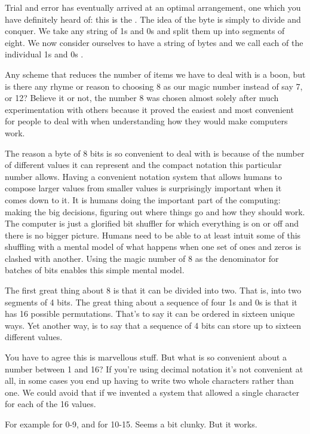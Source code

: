 Trial and error has eventually arrived at an optimal arrangement, one which
you have definitely heard of: this is the . The idea of the byte
is simply to divide and conquer. We take any string of 1s and 0s and split
them up into segments of eight. We now consider ourselves to have a string
of bytes and we call each of the individual 1s and 0s . 

Any scheme that reduces the number of items we have to deal with is a boon,
but is there any rhyme or reason to choosing 8 as our magic number instead
of say 7, or 12? Believe it or not, the number 8 was chosen almost solely
after much experimentation with others because it proved the easiest and
most convenient for people to deal with when understanding how they would
make computers work.

The reason a byte of 8 bits is so convenient to deal with is because of
the number of different values it can represent and the compact notation
this particular number allows. Having a convenient notation system that
allows humans to compose larger values from smaller values is surprisingly
important when it comes down to it. It is humans doing the important part
of the computing: making the big decisions, figuring out where things go
and how they should work. The computer is just a glorified bit shuffler
for which everything is on or off and there is no bigger picture. Humans
need to be able to at least intuit some of this shuffling with a mental
model of what happens when one set of ones and zeros is clashed with another.
Using the magic number of 8 as the denominator for batches of bits enables
this simple mental model.

The first great thing about 8 is that it can be divided into two. That is,
into two segments of 4 bits. The great thing about a sequence of four 1s
and 0s is that it has 16 possible permutations. That's to say it can be
ordered in sixteen unique ways. Yet another way, is to say that a sequence
of 4 bits can store up to sixteen different values.

You have to agree this is marvellous stuff. But what is so convenient
about a number between 1 and 16? If you're using decimal notation it's
not convenient at all, in some cases you end up having to write two
whole characters rather than one. We could avoid that if we invented
a system that allowed a single character for each of the 16 values.

For example  for 0-9, and  for 10-15. Seems a bit
clunky. But it works.

